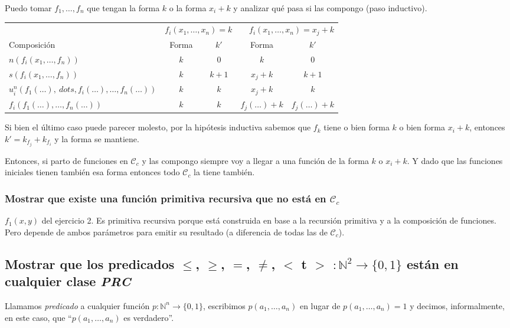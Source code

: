 \documentclass[fleqn, 11pt]{article}
\newcommand{\nat}{\mathbb{N}}
\newcommand{\Ccur}{\mathcal{C}}
\begin{document}
Puedo tomar $f_1, \dots, f_n$ que tengan la forma $k$ o la forma $x_i + k$  y
analizar qué pasa si las compongo (paso inductivo).

\begin{center}
	\begin{tabular}{lcccc}
		& \multicolumn{2}{l}{$f_i(x_1, \dots, x_n) = k$}
		& \multicolumn{2}{r}{$f_i(x_1, \dots, x_n) = x_j + k$} \\
		\cmidrule{2-5}
		Composición
		& Forma & $k'$    & Forma     & $k'$ \\ \toprule
		$n(f_i(x_1, \dots, f_n))$
		& $k$   & $0$     & $k$       & $0$ \\
		$s(f_i(x_1, \dots, f_n))$
		& $k$   & $k + 1$ & $x_j + k$ & $k + 1$ \\
		$u^n_i(f_1(\dots), \ dots, f_i(\dots), \dots, f_n(\dots))$
		& $k$   & $k$     & $x_j + k$ & $k$ \\
		$f_i(f_1(\dots), \dots, f_n(\dots))$
		& $k$   & $k$     & $f_j(\dots) + k$ & $f_j(\dots) + k$
	\end{tabular}
\end{center}

Si bien el último caso puede parecer molesto, por la hipótesis inductiva
sabemos que $f_k$ tiene o bien forma $k$ o bien forma $x_i + k$, entonces
$k' = k_{f_j} + k_{f_i}$ y la forma se mantiene.

Entonces, si parto de funciones en $\Ccur_c$ y las compongo siempre voy a
llegar a una función de la forma $k$ o $x_i + k$. Y dado que las funciones
iniciales tienen también esa forma entonces todo $\Ccur_c$ la tiene también.

\subsubsection{Mostrar que existe una función primitiva recursiva que no está
en $\Ccur_c$}

$f_1(x, y)$ del ejercicio 2. Es primitiva recursiva porque está construida en
base a la recursión primitiva y a la composición de funciones. Pero depende de
ambos parámetros para emitir su resultado (a diferencia de todas las de
$\Ccur_c$).

\subsection{Mostrar que los predicados $\leq$, $\geq$, $=$, $\neq$, $<$ t $>$
$:\nat^2 \to \{0, 1\}$ están en cualquier clase \emph{PRC}}

Llamamos \emph{predicado} a cualquier función $p: \nat^n \to \{0, 1\}$,
escribimos $p(a_1, \dots, a_n)$ en lugar de $p(a_1, \dots, a_n)=1$ y decimos,
informalmente, en este caso, que ``$p(a_1, \dots, a_n)$ es verdadero''.
\end{document}

